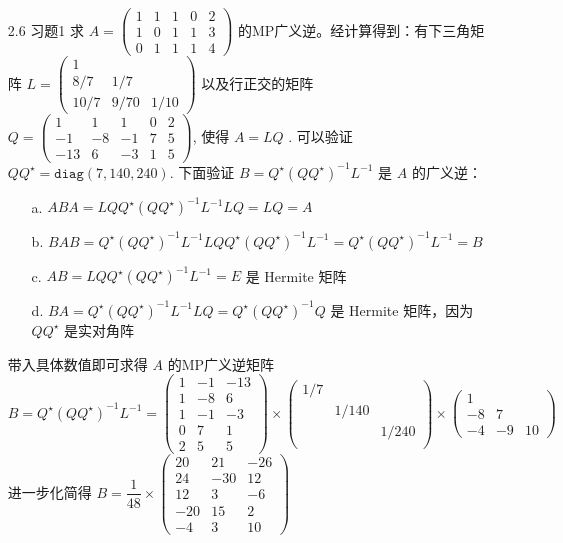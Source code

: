 \documentclass{article}
\begin{document}
\begin{spacing}{1.5}
\begin{enumerate}
        \item [2.6 习题1] 求 $A=\left(\begin{array}{ccccc}1&1&1&0&2\\1&0&1&1&3\\0&1&1&1&4\end{array}\right)$ 的MP广义逆。经计算得到：有下三角矩阵 $L = \left(\begin{array}{ccc}1&&\\8/7&1/7&\\10/7&9/70&1/10\end{array}\right)$ 以及行正交的矩阵 
        $Q = \left(\begin{array}{ccccc}1&1&1&0&2\\-1&-8&-1&7&5\\-13&6&-3&1&5\end{array}\right)$, 使得 $A=L Q$ . 可以验证 $QQ^\star = \mathtt{diag}(7, 140, 240)$. 下面验证 $B = Q^\star (QQ^\star)^{-1} L^{-1}$ 是 $A$ 的广义逆：
        \begin{enumerate}
            \item [a.] $ABA = LQ Q^\star (QQ^\star)^{-1} L^{-1} LQ = LQ = A$
            \item [b.] $BAB = Q^\star (QQ^\star)^{-1} L^{-1} LQ Q^\star (QQ^\star)^{-1} L^{-1} = Q^\star (QQ^\star)^{-1} L^{-1} = B$
            \item [c.] $AB = LQ Q^\star (QQ^\star)^{-1} L^{-1} = E$ 是 Hermite 矩阵
            \item [d.] $BA = Q^\star (QQ^\star)^{-1} L^{-1} LQ = Q^\star (QQ^\star)^{-1} Q$ 是 Hermite 矩阵，因为 $QQ^\star$ 是实对角阵
        \end{enumerate}
        带入具体数值即可求得 $A$ 的MP广义逆矩阵 
        $$B = Q^\star (QQ^\star)^{-1} L^{-1} = \left(\begin{array}{ccc}1&-1&-13\\1&-8&6\\1&-1&-3\\0&7&1\\2&5&5\end{array}\right)\times\left(
            \begin{array}{ccc}1/7&&\\&1/140&\\&&1/240\\\end{array}
        \right)\times\left(\begin{array}{ccc}1&&\\-8&7&\\-4&-9&10\end{array}\right)$$
        进一步化简得 $B = \dfrac{1}{48}\times\left(\begin{array}{ccc}20&21&-26\\24&-30&12\\12&3&-6\\-20&15&2\\-4&3&10\end{array}\right)$
    

\end{enumerate}
\end{spacing}
\end{document}
